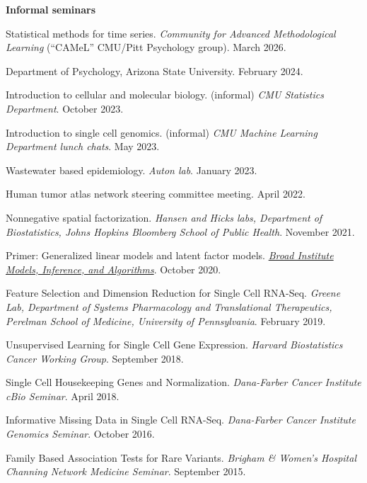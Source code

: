 \documentclass[10pt]{article}
\begin{document}
\textbf{Informal seminars}
\begin{enumerate}[label= {[\arabic*]}]
\item Statistical methods for time series. {\it Community for Advanced Methodological Learning} (``CAMeL'' CMU/Pitt Psychology group). March 2026.
\item Department of Psychology, Arizona State University. February 2024.
\item Introduction to cellular and molecular biology. (informal) {\it CMU Statistics Department}. October 2023.
\item Introduction to single cell genomics. (informal) {\it CMU Machine Learning Department lunch chats}. May 2023.
\item Wastewater based epidemiology. {\it Auton lab}. January 2023.
\item Human tumor atlas network steering committee meeting. April 2022.
\item Nonnegative spatial factorization. {\it Hansen and Hicks labs, Department of Biostatistics, Johns Hopkins Bloomberg School of Public Health}. November 2021.
\item Primer: Generalized linear models and latent factor models. \href{https://www.broadinstitute.org/talks/primer-generalized-linear-models-and-latent-factor-models}{{\it Broad Institute Models, Inference, and Algorithms}}. October 2020.
\item Feature Selection and Dimension Reduction for Single Cell RNA-Seq. {\it Greene Lab, Department of Systems Pharmacology and Translational Therapeutics, Perelman School of Medicine, University of Pennsylvania}. February 2019.
\item Unsupervised Learning for Single Cell Gene Expression. {\it Harvard Biostatistics Cancer Working Group}. September 2018.
\item Single Cell Housekeeping Genes and Normalization. {\it Dana-Farber Cancer Institute cBio Seminar}. April 2018.
\item Informative Missing Data in Single Cell RNA-Seq. {\it Dana-Farber Cancer Institute Genomics Seminar}. October 2016.
\item Family Based Association Tests for Rare Variants. {\it Brigham \& Women's Hospital Channing Network Medicine Seminar}. September 2015.
\end{enumerate}
\end{document}
